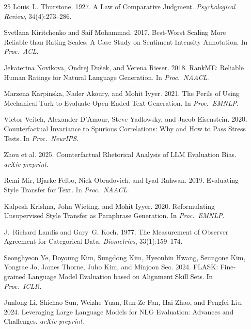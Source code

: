 \documentclass[11pt,a4paper]{article}
\begin{document}
\begin{thebibliography}{25}
Louis~L. Thurstone. 1927.
A Law of Comparative Judgment.
\textit{Psychological Review}, 34(4):273--286.

Svetlana Kiritchenko and Saif Mohammad. 2017.
Best-Worst Scaling More Reliable than Rating Scales: A Case Study on Sentiment Intensity Annotation.
In \textit{Proc.\ ACL}.

Jekaterina Novikova, Ondrej Du\v{s}ek, and Verena Rieser. 2018.
RankME: Reliable Human Ratings for Natural Language Generation.
In \textit{Proc.\ NAACL}.

Marzena Karpinska, Nader Akoury, and Mohit Iyyer. 2021.
The Perils of Using Mechanical Turk to Evaluate Open-Ended Text Generation.
In \textit{Proc.\ EMNLP}.

Victor Veitch, Alexander D'Amour, Steve Yadlowsky, and Jacob Eisenstein. 2020.
Counterfactual Invariance to Spurious Correlations: Why and How to Pass Stress Tests.
In \textit{Proc.\ NeurIPS}.

Zhou et al. 2025.
Counterfactual Rhetorical Analysis of LLM Evaluation Bias.
\textit{arXiv preprint}.

Remi Mir, Bjarke Felbo, Nick Obradovich, and Iyad Rahwan. 2019.
Evaluating Style Transfer for Text.
In \textit{Proc.\ NAACL}.

Kalpesh Krishna, John Wieting, and Mohit Iyyer. 2020.
Reformulating Unsupervised Style Transfer as Paraphrase Generation.
In \textit{Proc.\ EMNLP}.

J.~Richard Landis and Gary~G. Koch. 1977.
The Measurement of Observer Agreement for Categorical Data.
\textit{Biometrics}, 33(1):159--174.

Seonghyeon Ye, Doyoung Kim, Sungdong Kim, Hyeonbin Hwang, Seungone Kim, Yongrae Jo, James Thorne, Juho Kim, and Minjoon Seo. 2024.
FLASK: Fine-grained Language Model Evaluation based on Alignment Skill Sets.
In \textit{Proc.\ ICLR}.

Junlong Li, Shichao Sun, Weizhe Yuan, Run-Ze Fan, Hai Zhao, and Pengfei Liu. 2024.
Leveraging Large Language Models for NLG Evaluation: Advances and Challenges.
\textit{arXiv preprint}.

\end{thebibliography}
\end{document}
